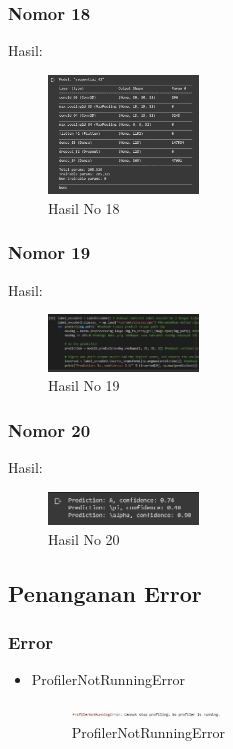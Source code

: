 \subsubsection{Nomor 18}
\hfill\break

Hasil:
\begin{figure}[H]
\centering
	\includegraphics[width=4cm]{figures/1174066/7/no18.jpg}
	\caption{Hasil No 18}
\end{figure}

\subsubsection{Nomor 19}
\hfill\break

Hasil:
\begin{figure}[H]
\centering
	\includegraphics[width=4cm]{figures/1174066/7/no19.jpg}
	\caption{Hasil No 19}
\end{figure}

\subsubsection{Nomor 20}
\hfill\break

Hasil:
\begin{figure}[H]
\centering
	\includegraphics[width=4cm]{figures/1174066/7/no20.jpg}
	\caption{Hasil No 20}
\end{figure}
\subsection{Penanganan Error}
\subsubsection{Error}
\hfill\break
\begin{itemize}
\item ProfilerNotRunningError

\begin{figure}[H]
\centering
	\includegraphics[width=4cm]{figures/1174066/7/error1.jpg}
\caption{ProfilerNotRunningError}
\end{figure}
\end{itemize}
